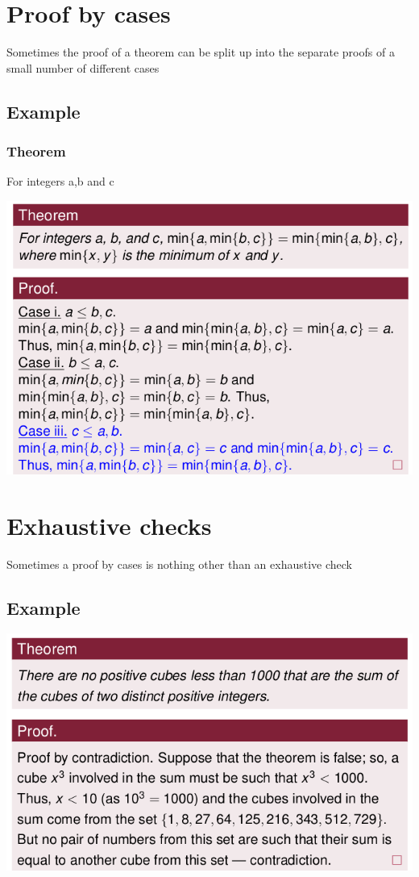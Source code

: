 \documentclass{article}[18pt]
\begin{document}
\section{Proof by cases}
Sometimes the proof of a theorem can be split up into the separate proofs of a small number of different cases
\subsection{Example}
\subsubsection{Theorem}
For integers a,b and c
\begin{center}
	\includegraphics[scale=0.7]{cases}
\end{center}

\section{Exhaustive checks} 
Sometimes a proof by cases is nothing other than an exhaustive check
\subsection{Example}
\begin{center}
	\includegraphics[scale=0.7]{exhaustive}
\end{center}
\end{document}
